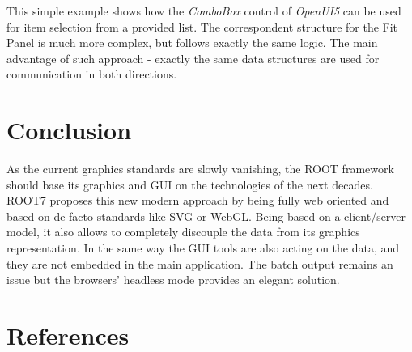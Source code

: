 \documentclass[a4paper]{jpconf}
\begin{document}
This simple example shows how the \textit{ComboBox} control of \textit{OpenUI5} can be used for item selection from a provided list.
The correspondent structure for the Fit Panel is much more complex, but follows exactly the same logic.
The main advantage of such approach - exactly the same data structures are used for communication in both directions.


\section{Conclusion}

As the current graphics standards are slowly vanishing, the ROOT framework should
base its graphics and GUI on the technologies of the next decades. ROOT7 proposes
this new modern approach by being fully web oriented and based on de facto standards
like SVG or WebGL. Being based on a client/server model, it also allows to completely
discouple the data from its graphics representation. In the same way the GUI tools
are also acting on the data, and they are not embedded in the main application.
The batch output remains an issue but the browsers' headless mode provides an elegant solution.


\section{References}

\end{document}
